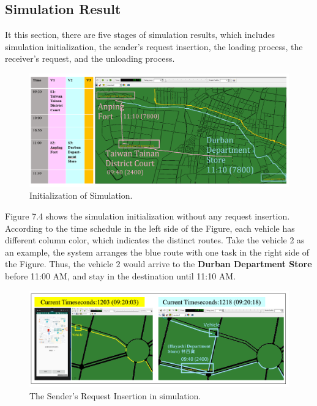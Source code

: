 \documentclass[12pt]{ksthesis}
\begin{document}
\begin{thesis}
{\section{Simulation Result}
It this section, there are five stages of simulation results, which includes simulation initialization, the sender’s request insertion, the loading process, the receiver’s request, and the unloading process.

\begin{figure}[H]
\centering
\includegraphics[width=1.0\textwidth]{./Thesis_figures/F7-4_initialization.PNG}
\caption{\large Initialization of Simulation.}
\vspace{0.5cm}
\label{Fig:Initialization_of_Simulation}
\end{figure}

Figure 7.4 shows the simulation initialization without any request insertion. According to the time schedule in the left side of the Figure, each vehicle has different column color, which indicates the distinct routes. Take the vehicle 2 as an example, the system arranges the blue route with one task in the right side of the Figure. Thus, the vehicle 2 would arrive to the \textbf{Durban Department Store} before 11:00 AM, and stay in the destination until 11:10 AM.




\begin{figure}[H]
\centering
\includegraphics[width=1.0\textwidth]{./Thesis_figures/F7-5_senderRequest.PNG}
\caption{\large The Sender’s Request Insertion in simulation.}
\vspace{0.5cm}
\label{Fig:sender_request}
\end{figure}

}
\end{thesis}
\end{document}
